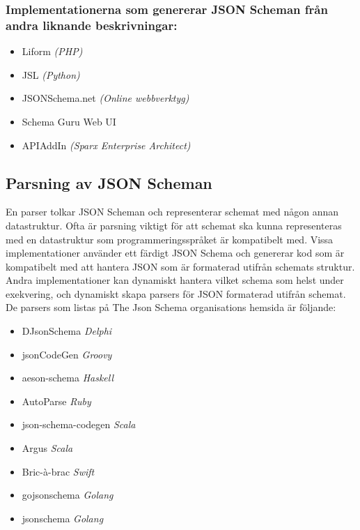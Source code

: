 \subsubsection{Implementationerna som genererar JSON Scheman från andra liknande beskrivningar:}
\begin{itemize}
	\item Liform \textit{(PHP)} \cite{Limenius}
	\item JSL \textit{(Python)} \cite{Romanovich}
	\item JSONSchema.net \textit{(Online webbverktyg)} \cite{Bovet}
	\item Schema Guru Web UI
	\item APIAddIn \textit{(Sparx Enterprise Architect)} \cite{Tomlinson}
\end{itemize}

\subsection{Parsning av JSON Scheman}
\label{sec:teori:schema-användningsområden:parsning}
En parser tolkar JSON Scheman och representerar schemat med någon annan datastruktur. Ofta är parsning viktigt för att schemat ska kunna representeras med en datastruktur som programmeringsspråket är kompatibelt med. Vissa implementationer använder ett färdigt JSON Schema och genererar kod som är kompatibelt med att hantera JSON som är formaterad utifrån schemats struktur. Andra implementationer kan dynamiskt hantera vilket schema som helst under exekvering, och dynamiskt skapa parsers för JSON formaterad utifrån schemat. De parsers som listas på The Json Schema organisations hemsida är följande:

\begin{itemize}
	\item DJsonSchema \textit{Delphi} \cite{Schlothauer&WauerGmbH}
	\item jsonCodeGen \textit{Groovy} \cite{Schlothauer&WauerGmbHa}
	\item aeson-schema \textit{Haskell} \cite{Kowalczyk}
	\item AutoParse \textit{Ruby} \cite{Googleb}
	\item json-schema-codegen \textit{Scala} \cite{Tundra}
	\item Argus \textit{Scala} \cite{Fenton}
	\item Bric-à-brac \textit{Swift} \cite{GlimpseI/OInc}
	\item gojsonschema \textit{Golang} \cite{Zhangtao}
	\item jsonschema \textit{Golang} \cite{Qriinc.}
\end{itemize}

